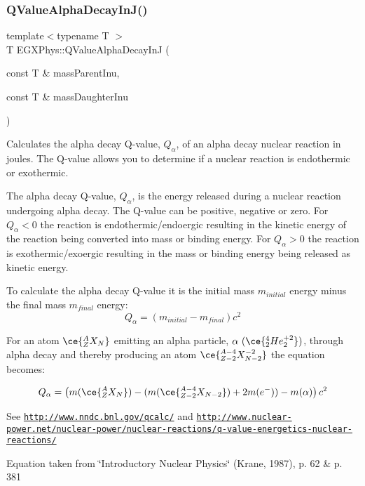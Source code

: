 \subsubsection{\texorpdfstring{Q\+Value\+Alpha\+Decay\+In\+J()}{QValueAlphaDecayInJ()}}
{\footnotesize\ttfamily template$<$typename T $>$ \\
T E\+G\+X\+Phys\+::\+Q\+Value\+Alpha\+Decay\+InJ (\begin{DoxyParamCaption}\item[{const T \&}]{mass\+Parent\+Inu,  }\item[{const T \&}]{mass\+Daughter\+Inu }\end{DoxyParamCaption})}



Calculates the alpha decay Q-\/value, $Q_{\alpha}$, of an alpha decay nuclear reaction in joules. The Q-\/value allows you to determine if a nuclear reaction is endothermic or exothermic. 

The alpha decay Q-\/value, $Q_{\alpha}$, is the energy released during a nuclear reaction undergoing alpha decay. The Q-\/value can be positive, negative or zero. For $Q_{\alpha} < 0$ the reaction is endothermic/endoergic resulting in the kinetic energy of the reaction being converted into mass or binding energy. For $Q_{\alpha} > 0$ the reaction is exothermic/exoergic resulting in the mass or binding energy being released as kinetic energy.

To calculate the alpha decay Q-\/value it is the initial mass $m_{initial}$ energy minus the final mass $m_{final}$ energy\+: \[Q_{\alpha} = \left ( m_{initial}-m_{final}\right ) c^2\]

For an atom $\ce{ ^{A}_{Z}X_{N} }$ emitting an alpha particle, $\alpha\ (\ce{ ^{4}_{2}He^{+2}_{2} })$, through alpha decay and thereby producing an atom $\ce{ ^{A-4}_{Z{-2}}X^{-2}_{N-2} }$ the equation becomes\+:

\[Q_{\alpha} = \left ( m(\ce{ ^{A}_{Z}X_{N} }) - (m(\ce{ ^{A-4}_{Z{-2}}X_{N-2} }) + 2m(e^-)) - m(\alpha)\right ) c^2\]

See \href{http://www.nndc.bnl.gov/qcalc/}{\tt http\+://www.\+nndc.\+bnl.\+gov/qcalc/} and \href{http://www.nuclear-power.net/nuclear-power/nuclear-reactions/q-value-energetics-nuclear-reactions/}{\tt http\+://www.\+nuclear-\/power.\+net/nuclear-\/power/nuclear-\/reactions/q-\/value-\/energetics-\/nuclear-\/reactions/}

Equation taken from \char`\"{}\+Introductory Nuclear Physics\char`\"{} (Krane, 1987), p. 62 \& p. 381


